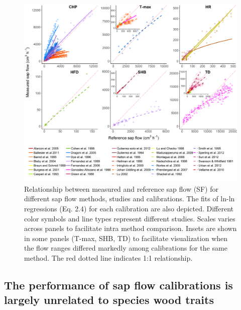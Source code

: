 \documentclass[11pt,twoside]{reedthesis}
\begin{document}
\begin{figure}[p]

{\centering \includegraphics[width=1\linewidth]{figure/CH2/figure-totalflow} 

}

\caption[Relationship between measured and reference sap flow (SF) for different sap flow methods, studies and calibrations.]{Relationship between measured and reference sap flow (SF) for different sap flow methods, studies and calibrations. The fits of ln-ln regressions (Eq. 2.4) for each calibration are also depicted. Different color symbols and line types represent different studies. Scales varies across panels to facilitate intra method comparison. Insets are shown in some panels (T-max, SHB, TD) to facilitate visualization when the flow ranges differed markedly among calibrations for the same method. The red dotted line indicates 1:1 relationship.}\label{fig:ch2fig6}
\end{figure}
\subsection{The performance of sap flow calibrations is largely
unrelated to species wood
traits}\label{the-performance-of-sap-flow-calibrations-is-largely-unrelated-to-species-wood-traits}
\end{document}
